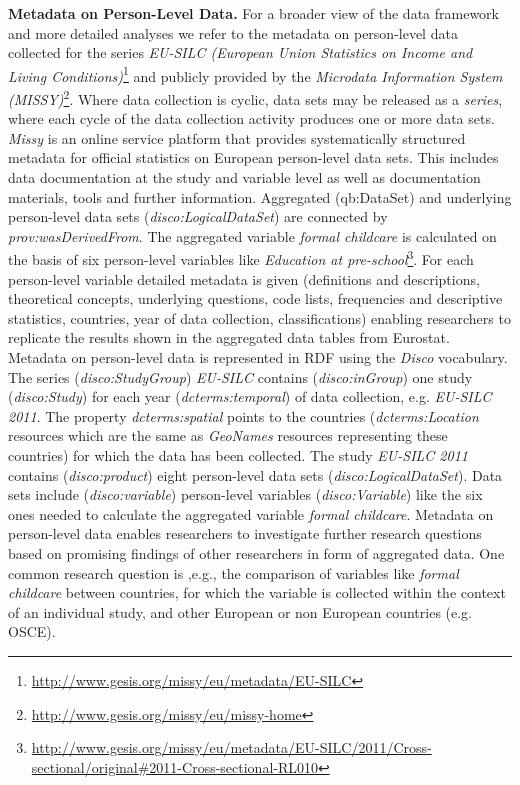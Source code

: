\documentclass{llncs}
\begin{document}
\textbf{Metadata on Person-Level Data.}
For a broader view of the data framework and more detailed analyses we refer to the metadata on person-level data collected for the series \emph{EU-SILC (European Union Statistics on Income and Living Conditions)}\footnote{\url{http://www.gesis.org/missy/eu/metadata/EU-SILC}} 
and publicly provided by the \emph{Microdata Information System (MISSY)}\footnote{\url{http://www.gesis.org/missy/eu/missy-home}}.
Where data collection is cyclic, data sets may be released as a \emph{series}, 
where each cycle of the data collection activity produces one or more data sets. 
\emph{Missy} is an online service platform that provides systematically structured metadata for official statistics on European person-level data sets. This includes data documentation at the study and variable level as well as documentation materials, tools and further information. 
Aggregated (qb:DataSet) and underlying person-level data sets (\emph{disco:LogicalDataSet}) are connected by \emph{prov:wasDerivedFrom}. 
The aggregated variable \emph{formal childcare} is calculated on the basis of six person-level variables like 
\emph{Education at pre-school}\footnote{\url{http://www.gesis.org/missy/eu/metadata/EU-SILC/2011/Cross-sectional/original#2011-Cross-sectional-RL010}}.
For each person-level variable detailed metadata is given (definitions and descriptions, theoretical concepts, underlying questions, code lists, frequencies and descriptive statistics, countries, year of data collection, classifications) enabling researchers to replicate the results shown in the aggregated data tables from Eurostat.
Metadata on person-level data is represented in RDF using the \emph{Disco} vocabulary.
The series (\emph{disco:StudyGroup}) \emph{EU-SILC} contains (\emph{disco:inGroup}) one study (\emph{disco:Study}) for each year (\emph{dcterms:temporal}) of data collection, e.g. \emph{EU-SILC 2011}.   
The property \emph{dcterms:spatial} points to the countries (\emph{dcterms:Location} resources which are the same as \emph{GeoNames} resources representing these countries) for which the data has been collected.
The study \emph{EU-SILC 2011} contains (\emph{disco:product}) eight person-level data sets (\emph{disco:LogicalDataSet}).
Data sets include (\emph{disco:variable}) person-level variables (\emph{disco:Variable}) like the six ones needed to calculate the aggregated variable \emph{formal childcare}.
Metadata on person-level data enables researchers to investigate further research questions based on promising findings of other researchers in form of aggregated data.
One common research question is ,e.g., the comparison of variables like 
\emph{formal childcare} between countries, for which the variable is collected within the context of an individual study, and other European or non European countries (e.g. OSCE).
\end{document}
